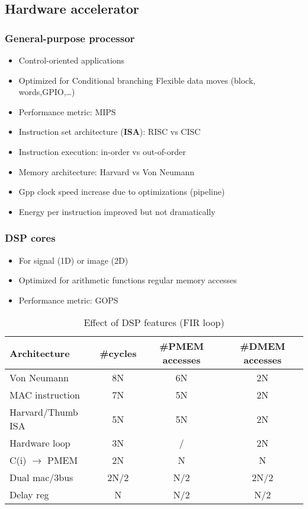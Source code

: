 \subsection{Hardware accelerator}
\subsubsection{General-purpose processor}
\begin{itemize}
  \item Control-oriented applications
  \item Optimized for
    \subitem Conditional branching
    \subitem Flexible data moves (block, words,GPIO,\dots)
  \item Performance metric: MIPS
  \item Instruction set architecture (\textbf{ISA}): RISC vs CISC
  \item Instruction execution: in-order vs out-of-order
  \item Memory architecture: Harvard vs Von Neumann
  \item Gpp clock speed increase due to optimizations (pipeline)
  \item Energy per instruction improved but not dramatically
\end{itemize}


\subsubsection{DSP cores}
\begin{itemize}
  \item For signal (1D) or image (2D)
  \item Optimized for
    \subitem arithmetic functions
    \subitem regular memory accesses
  \item Performance metric: GOPS
\end{itemize}



\begin{table}[!ht]
  \centering
  \begin{tabular}{|l|c|c|c|}
    \hline
    Architecture&\#cycles& \#PMEM accesses& \#DMEM accesses\\
    \hline \hline
    Von Neumann & 8N& 6N& 2N\\
    \hline
    MAC instruction& 7N&5N&2N\\
    \hline
    Harvard/Thumb ISA& 5N&5N&2N\\
    \hline
    Hardware loop& 3N& / &2N\\
    \hline
    C(i) \(\rightarrow\) PMEM& 2N& N& N\\
    \hline
    Dual mac/3bus& 2N/2& N/2& 2N/2\\
    \hline
    Delay reg& N&N/2&N/2\\
    \hline
  \end{tabular}
  \caption{Effect of DSP features (FIR loop)}
  \label{table:dsp}
\end{table}

